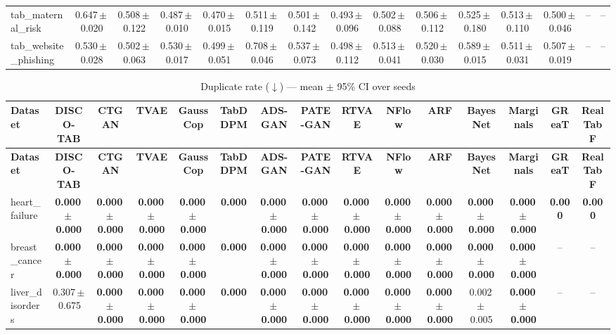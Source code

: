 \documentclass[8pt]{extarticle}
\begin{document}
\begin{longtable}{l*{14}{c}}
tab\_maternal\_risk & 0.647\,$\pm$\,0.020 & 0.508\,$\pm$\,0.122 & 0.487\,$\pm$\,0.010 & 0.470\,$\pm$\,0.015 & 0.511\,$\pm$\,0.119 & 0.501\,$\pm$\,0.142 & 0.493\,$\pm$\,0.096 & 0.502\,$\pm$\,0.088 & 0.506\,$\pm$\,0.112 & 0.525\,$\pm$\,0.180 & 0.513\,$\pm$\,0.110 & 0.500\,$\pm$\,0.046 & -- & -- \\
tab\_website\_phishing & 0.530\,$\pm$\,0.028 & 0.502\,$\pm$\,0.063 & 0.530\,$\pm$\,0.017 & 0.499\,$\pm$\,0.051 & 0.708\,$\pm$\,0.046 & 0.537\,$\pm$\,0.073 & 0.498\,$\pm$\,0.112 & 0.513\,$\pm$\,0.041 & 0.520\,$\pm$\,0.030 & 0.589\,$\pm$\,0.015 & 0.511\,$\pm$\,0.031 & 0.507\,$\pm$\,0.019 & -- & -- \\
\end{longtable}
\begin{longtable}{l*{14}{c}}
\caption{Duplicate rate ($\downarrow$) --- mean $\pm$ 95\% CI over seeds}\\
\toprule
\textbf{Dataset} & \textbf{DISCO-TAB} & \textbf{CTGAN} & \textbf{TVAE} & \textbf{GaussCop} & \textbf{TabDDPM} & \textbf{ADS-GAN} & \textbf{PATE-GAN} & \textbf{RTVAE} & \textbf{NFlow} & \textbf{ARF} & \textbf{BayesNet} & \textbf{Marginals} & \textbf{GReaT} & \textbf{RealTabF} \\
\midrule
\endfirsthead
\toprule
\textbf{Dataset} & \textbf{DISCO-TAB} & \textbf{CTGAN} & \textbf{TVAE} & \textbf{GaussCop} & \textbf{TabDDPM} & \textbf{ADS-GAN} & \textbf{PATE-GAN} & \textbf{RTVAE} & \textbf{NFlow} & \textbf{ARF} & \textbf{BayesNet} & \textbf{Marginals} & \textbf{GReaT} & \textbf{RealTabF} \\
\midrule
\endhead
\bottomrule
\endfoot
heart\_failure & \textbf{0.000\,$\pm$\,0.000} & \textbf{0.000\,$\pm$\,0.000} & \textbf{0.000\,$\pm$\,0.000} & \textbf{0.000\,$\pm$\,0.000} & \textbf{0.000} & \textbf{0.000\,$\pm$\,0.000} & \textbf{0.000\,$\pm$\,0.000} & \textbf{0.000\,$\pm$\,0.000} & \textbf{0.000\,$\pm$\,0.000} & \textbf{0.000\,$\pm$\,0.000} & \textbf{0.000\,$\pm$\,0.000} & \textbf{0.000\,$\pm$\,0.000} & \textbf{0.000} & \textbf{0.000} \\
breast\_cancer & \textbf{0.000\,$\pm$\,0.000} & \textbf{0.000\,$\pm$\,0.000} & \textbf{0.000\,$\pm$\,0.000} & \textbf{0.000\,$\pm$\,0.000} & \textbf{0.000} & \textbf{0.000\,$\pm$\,0.000} & \textbf{0.000\,$\pm$\,0.000} & \textbf{0.000\,$\pm$\,0.000} & \textbf{0.000\,$\pm$\,0.000} & \textbf{0.000\,$\pm$\,0.000} & \textbf{0.000\,$\pm$\,0.000} & \textbf{0.000\,$\pm$\,0.000} & -- & -- \\
liver\_disorders & 0.307\,$\pm$\,0.675 & \textbf{0.000\,$\pm$\,0.000} & \textbf{0.000\,$\pm$\,0.000} & \textbf{0.000\,$\pm$\,0.000} & \textbf{0.000} & \textbf{0.000\,$\pm$\,0.000} & \textbf{0.000\,$\pm$\,0.000} & \textbf{0.000\,$\pm$\,0.000} & \textbf{0.000\,$\pm$\,0.000} & \textbf{0.000\,$\pm$\,0.000} & 0.002\,$\pm$\,0.005 & \textbf{0.000\,$\pm$\,0.000} & -- & -- \\

\end{longtable}
\end{document}
